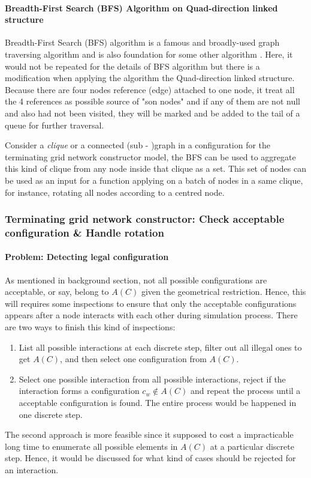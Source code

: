 \paragraph{Breadth-First Search (BFS) Algorithm \cite{Cormen:2009:IAT:1614191} on Quad-direction linked structure}
Breadth-First Search (BFS) algorithm is a famous and broadly-used graph traversing algorithm and is also
foundation for some other algorithm \cite{Cormen:2009:IAT:1614191}. Here, it would not be repeated for the
details of BFS algorithm but there is a modification when applying the algorithm the Quad-direction linked structure.
Because there are four nodes reference (edge) attached to one node, it treat all the 4 references as possible source of "son nodes" and if
any of them are not null and also had not been visited, they will be marked and be added to the tail of a queue for further traversal.

\par\noindent
Consider a \textit{clique} or a connected (sub - )graph in a configuration for the terminating grid network constructor model,
the BFS can be used to aggregate this kind of clique from any node inside that clique as a set. This set of nodes can be used
as an input for a function applying on a batch of nodes in a same clique, for instance, rotating all nodes according to a centred node.

\subsubsection{Terminating grid network constructor: Check acceptable configuration \& Handle rotation}
\paragraph{Problem: Detecting legal configuration}
As mentioned in background section, not all possible configurations are acceptable, or say, belong to $A(C)$ given the geometrical restriction\cite{Mi17}.
Hence, this will requires some inspections to ensure that only the acceptable configurations appears
after a node interacts with each other during simulation process. There are two ways to finish this kind of inspections:
\begin{enumerate}
  \item List all possible interactions at each discrete step, filter out
  all illegal ones to get $A(C)$, and then select one configuration from $A(C)$.
  \item Select one possible interaction from all possible interactions, reject if the interaction forms a configuration $c_{w} \not\in A(C)$
  and repeat the process until a acceptable configuration is found. The entire process would be happened in one discrete step.
\end{enumerate}
The second approach is more feasible since it supposed to cost a impracticable long time to enumerate all possible elements in $A(C)$ at a particular discrete step.
Hence, it would be discussed for what kind of cases should be rejected for an interaction.

